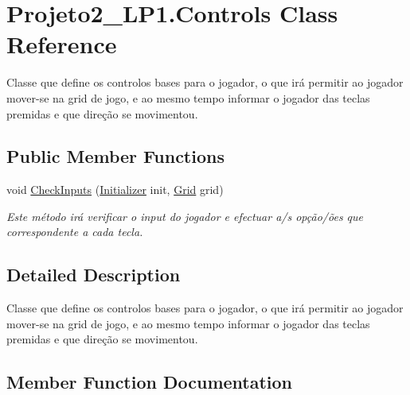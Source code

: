 \hypertarget{class_projeto2___l_p1_1_1_controls}{}\section{Projeto2\+\_\+\+L\+P1.\+Controls Class Reference}
\label{class_projeto2___l_p1_1_1_controls}


Classe que define os controlos bases para o jogador, o que irá permitir ao jogador mover-\/se na grid de jogo, e ao mesmo tempo informar o jogador das teclas premidas e que direção se movimentou. ~\newline
 


\subsection*{Public Member Functions}
\begin{DoxyCompactItemize}
\item 
void \mbox{\hyperlink{class_projeto2___l_p1_1_1_controls_a68d858cc59d19e8626992484862de1bf}{Check\+Inputs}} (\mbox{\hyperlink{class_projeto2___l_p1_1_1_initializer}{Initializer}} init, \mbox{\hyperlink{class_projeto2___l_p1_1_1_grid}{Grid}} grid)
\begin{DoxyCompactList}\small\item\em Este método irá verificar o input do jogador e efectuar a/s opção/ões que correspondente a cada tecla. \end{DoxyCompactList}\end{DoxyCompactItemize}


\subsection{Detailed Description}
Classe que define os controlos bases para o jogador, o que irá permitir ao jogador mover-\/se na grid de jogo, e ao mesmo tempo informar o jogador das teclas premidas e que direção se movimentou. ~\newline




\subsection{Member Function Documentation}
\mbox{\label{class_projeto2___l_p1_1_1_controls_a68d858cc59d19e8626992484862de1bf}} 
